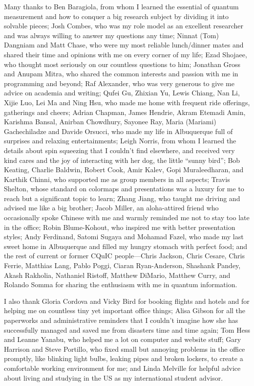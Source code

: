\begin{acknowledgments}
Many thanks to Ben Baragiola, from whom I learned the essential of quantum measurement and how to conquer a big research subject by dividing it into solvable pieces; 
Josh Combes, who was my role model as an excellent researcher and was always willing to answer my questions any time; 
Ninnat (Tom) Dangniam and Matt Chase, who were my most reliable lunch/dinner mates and shared their time and opinions with me on every corner of my life; 
Ezad Shojaee, who thought most seriously on our countless questions to him; 
Jonathan Gross and Anupam Mitra, who shared the common interests and passion with me in programming and beyond; 
Raf Alexander, who was very generous to give me advice on academia and writing; 
Qufei Gu, Zhixian Yu, Lewis Chiang, Nan Li, Xijie Luo, Lei Ma and Ning Hsu, who made me home with frequent ride offerings, gatherings and cheers; 
Adrian Chapman, James Hendrie, Akram Etemadi Amin, Karishma Bansal, Anirban Chowdhury, Sayonee Ray, Maria (Mariami) Gachechiladze and Davide Orsucci, who made my life in Albuquerque full of surprises and relaxing entertainments; 
Leigh Norris, from whom I learned the details about spin squeezing that I couldn't find elsewhere, and received very kind cares and the joy of interacting with her dog, the little ``sunny bird''; 
Bob Keating, Charlie Baldwin, Robert Cook, Amir Kalev, Gopi Muraleedharan, and Karthik Chinni, who supported me as group members in all aspects; 
Travis Shelton, whose standard on colormaps and presentations was a luxury for me to reach but a significant topic to learn; 
Zhang Jiang, who taught me driving and advised me like a big brother; 
Jacob Miller, an aloha-attired friend who occasionally spoke Chinese with me and warmly reminded me not to stay too late in the office; 
Robin Blume-Kohout, who inspired me with better presentation styles; 
Andy Ferdinand, Satomi Sugaya and Mohamad Fazel, who made my last sweet home in Albuquerque and filled my hungry stomach with perfect food; 
and the rest of current or former CQuIC people---Chris Jackson, Chris Cesare, Chris Ferrie, Matthias Lang, Pablo Poggi, Ciaran Ryan-Anderson, Shashank Pandey, Akash Rakholia, Nathaniel Ristoff, Matthew DiMario, Matthew Curry, and Rolando Somma for sharing the enthusiasm with me in quantum information.

I also thank Gloria Cordova and Vicky Bird for booking flights and hotels and for helping me on countless tiny yet important office things; 
Alisa Gibson for all the paperworks and administrative reminders that I couldn't imagine how she has successfully managed and saved me from disasters time and time again; 
Tom Hess and Leanne Yanabu, who helped me a lot on computer and website stuff; 
Gary Harrison and Steve Portillo, who fixed small but annoying problems in the office promptly, like blinking light bulbs, leaking pipes and broken lockers, to create a comfortable working environment for me; 
and Linda Melville for helpful advice about living and studying in the \hbox{US} as my international student advisor.


\end{acknowledgments}
